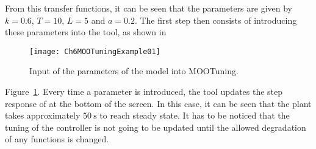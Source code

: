 From this transfer functions, it can be seen that the parameters are given by $k=0.6$, $T=10$, $L=5$ and $a = 0.2$. The first step then consists of introducing these parameters into the tool, as shown in %
\begin{figure}[tb]
	\centering
	\texttt{[image: Ch6MOOTuningExample01]}
	\caption{Input of the parameters of the model into MOOTuning.}
	\label{fig:Ch6MOOTuningExample01}
\end{figure}
%
Figure~\ref{fig:Ch6MOOTuningExample01}. Every time a parameter is introduced, the tool updates the step response of at the bottom of the screen. In this case, it can be seen that the plant takes approximately $\SI{50}{\second}$ to reach steady state. It has to be noticed that the tuning of the controller is not going to be updated until the allowed degradation of any functions is changed.

